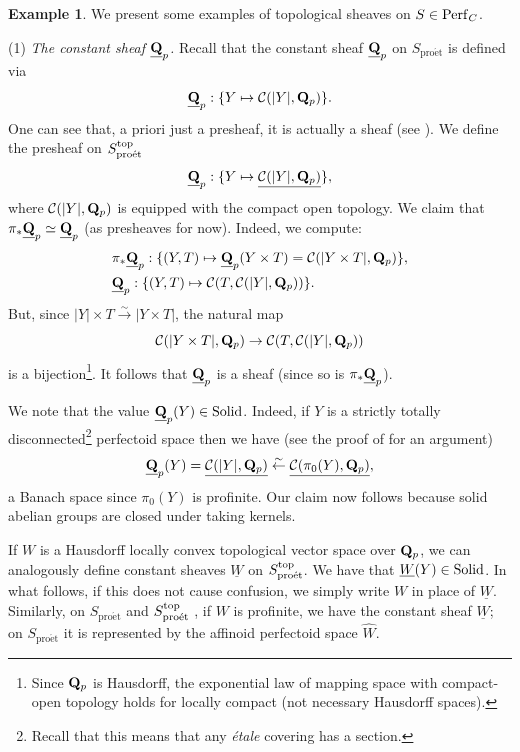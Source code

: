 \documentclass[10pt]{amsart}
\theoremstyle{definition}
\newtheorem{example}[equation]{Example}
\theoremstyle{remark}
\newcommand{\proeet}{\operatorname{pro\acute{e}t} }
\newcommand{\scc}{{\mathcal{C}}}
\newcommand{\wh}{\widehat}
\numberwithin{equation}{section}
\def\Q{{\bf Q}} \def\Z{{\bf Z}}
\numberwithin{equation}{section}
\begin{document}
    \begin{example} \label{ex1} We present some 
  examples of topological sheaves on $S\in {\rm Perf}_C$.
  
 (1)  {\em The constant sheaf $\underline{\Q}_p$.} Recall that the constant sheaf $\underline{\Q}_p$ on $S_{\proeet}$ is defined via 
 $$\underline{\Q}_p: \{Y\mapsto {\scc(|Y|,\Q_p)}\}.$$ One can see that, a priori just a presheaf,  it is actually a sheaf (see  \cite[Lemma 3.14]{MW}). We define the presheaf on $S_{\proeet}^{\rm top}$
 $$\underline{\Q}_p: \{Y\mapsto \underline{\scc(|Y|,\Q_p)}\},$$
 where  $\scc(|Y|,\Q_p)$ is equipped with the compact open topology.
 We claim that  $\pi_*\underline{\Q}_p\simeq\underline{\Q}_p$ (as presheaves for now). Indeed, we compute:
\begin{align*}
& \pi_*\underline{\Q}_p: \{(Y,T)\mapsto \underline{\Q}_p(Y\times {T})=\scc(|Y\times {T}|,\Q_p)\},\\
& \underline{\Q}_p: \{(Y,T)\mapsto \scc(T, {{\scc(|Y|,\Q_p)}})\}.
\end{align*}
But, since $|Y|\times {T}\stackrel{\sim}{\to}|Y\times {T}|$,  the natural map 
$$
\scc(|Y\times {T}|,\Q_p)\to \scc(T, { {\scc(|Y|,\Q_p)}})
$$
is a bijection\footnote{Since $\Q_p$ is Hausdorff, the exponential law of mapping space with compact-open topology holds for locally compact (not necessary
Hausdorff spaces).}.   It follows that $\underline{\Q}_p$ is a sheaf (since so is $\pi_*\underline{\Q}_p$). 

We note that the value $\underline{\Q}_p(Y)\in{\rm Solid}$. Indeed, if $Y$ is a strictly totally disconnected\footnote{Recall that this means that any {\em \'etale} covering has a section.} perfectoid space then we have (see the proof of \cite[Cor. 3.15]{MW} for an argument)
 $$\underline{\Q}_p(Y)=\underline{\scc(|Y|,\Q_p)}\stackrel{\sim}{\leftarrow} \underline{\scc(\pi_0(Y),\Q_p)},
 $$ a Banach space since $\pi_0(Y)$ is profinite. Our claim now follows because solid abelian groups are closed under taking kernels.

 
  If $W$ is  a Hausdorff  locally convex topological vector space  over $\Q_p$, we can analogously 
  define constant sheaves $\underline{W}$ on $S_{\proeet}^{\rm top}$. 
  We have that $\underline{W}(Y)\in {\rm Solid}$.   In what follows, if this does not cause confusion, we simply write $W$ in place of $\underline{W}$. 
  Similarly, on $S_{\proeet}$ and $S_{\proeet}^{\rm top}$ , if $W$ is profinite, we have the constant sheaf $\underline{W}$; on $S_{\proeet}$ it  is represented by the affinoid perfectoid space $\wh{W}$. 
  

\end{example}
\end{document}
